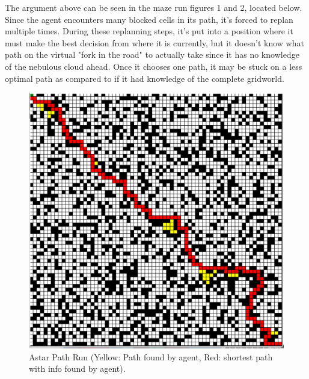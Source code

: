 \documentclass{homeworg}
\begin{document}
The argument above can be seen in the maze run figures 1 and 2, located below. Since the agent encounters many blocked cells in its path, it's forced to replan multiple times. During these replanning steps, it's put into a position where it must make the best decision from where it is currently, but it doesn't know what path on the virtual "fork in the road" to actually take since it has no knowledge of the nebulous cloud ahead. Once it chooses one path, it may be stuck on a less optimal path as compared to if it had knowledge of the complete gridworld.

\newpage
\begin{figure}[h]
  	\centering
  	\includegraphics*[scale=0.3]{Astar1.jpeg}
	\caption{Astar Path Run (Yellow: Path found by agent, Red: shortest path with info found by agent).}
	\label{fig:example}
\end{figure}
 
\end{document}
